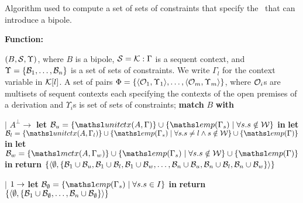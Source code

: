 \begin{algorithm}[pth]
\caption{\small Algorithm used to compute a set of sets of constraints
that specify the \bDers\ that can introduce a bipole.} 
\label{alg1}
\textbf{Function: }\bipole
\begin{small}
\begin{algorithmic}[1]
\REQUIRE  $(B, {\cal S}, \Upsilon)$, where $B$ is a bipole,
${\cal S} = {\cal K} : \Gamma$ is a sequent context, and $\Upsilon =
\{\mathcal{B}_1, \ldots, \mathcal{B}_n\}$ is a set of sets of constraints.
We write $\Gamma_l$ for the context variable in ${\cal K}[l]$.
\ENSURE A set of pairs $\Phi = \{\langle{\cal O}_1, \Upsilon_1\rangle, \ldots,
\langle{\cal O}_m, \Upsilon_m\rangle \}$, 
where ${\cal O}_i$s are multisets of sequent
contexts each specifying the contexts of the open premises of
a derivation and $\Upsilon_i$s is set of sets of constraints;
\STATE \textbf{match} $B$ \textbf{with}

\STATE $\mid$ $A^\bot \rightarrow$ 
\STATE \qquad \textbf{let} $\groundSet_u = \{\elin{A}{\Gamma}\}
\cup \{ \emp{\Gamma_s} \mid \forall s. s 
  \notin \Wscr\} $ \textbf{in} %
\STATE \qquad \textbf{let} $\groundSet_l = \{\elin{A}{\Gamma_l} \}
\cup \{ \emp{\Gamma_s} \mid \forall s. s
  \neq l \wedge s \notin \Wscr \} \cup \{ \emp{\Gamma} \}$ \textbf{in}
\STATE \qquad \textbf{let} $\groundSet_w = \{\mctx{A}{\Gamma_w} \}
\cup \{ \emp{\Gamma_s} \mid \forall s. s
  \notin \Wscr \} \cup \{ \emp{\Gamma} \}$ \textbf{in}
\STATE \qquad \textbf{return} $\{\langle\emptyset, \{\mathcal{B}_1 \cup
\mathcal{B}_u, \mathcal{B}_1 \cup \mathcal{B}_l, \mathcal{B}_1 \cup
\mathcal{B}_w,\ldots, \mathcal{B}_n \cup \mathcal{B}_u, \mathcal{B}_n \cup
\mathcal{B}_l, \mathcal{B}_n \cup \mathcal{B}_w\}\rangle\}$


\STATE $\mid$ $1 \rightarrow$ 
\STATE \qquad \textbf{let} $\groundSet_\emptyset = \{ \emp{\Gamma_s}
\mid
\forall s. s \in I\}$ \textbf{in}
\STATE \qquad \textbf{return} $\{\langle\emptyset, \{\mathcal{B}_1 \cup
\mathcal{B}_\emptyset,\ldots, \mathcal{B}_n \cup \mathcal{B}_\emptyset\}\rangle\}$


\end{algorithmic}
\end{small}
\end{algorithm}
